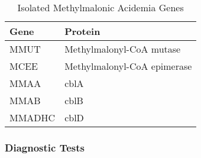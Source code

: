 \documentclass{scrartcl}
\begin{document}
\begin{table}[htbp]
\caption{\label{tab:orgb79e4c1}Isolated Methylmalonic Acidemia Genes}
\centering
\begin{tabular}{ll}
Gene & Protein\\
\hline
MMUT & Methylmalonyl-CoA mutase\\
MCEE & Methylmalonyl-CoA epimerase\\
MMAA & cblA\\
MMAB & cblB\\
MMADHC\footnotemark & cblD\\
\end{tabular}
\end{table}

\subsubsection{Diagnostic Tests}
\label{sec:orgfbde170}
\end{document}

